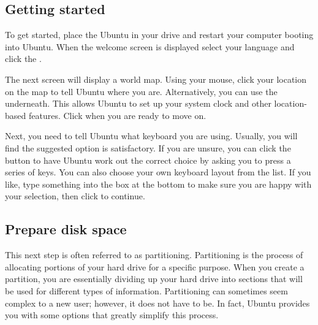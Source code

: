 \subsection{Getting started}
To get started, place the Ubuntu  in your  drive and restart your computer booting into Ubuntu. When the welcome screen is displayed select your language and click the .

The next screen will display a world map. Using your mouse, click your location on the map to tell Ubuntu where you are. Alternatively, you can use the  underneath. This allows Ubuntu to set up your system clock and other location-based features. Click  when you are ready to move on.


Next, you need to tell Ubuntu what keyboard you are using. Usually, you will find the suggested option is satisfactory. If you are unsure, you can click the  button to have Ubuntu work out the correct choice by asking you to press a series of keys. You can also choose your own keyboard layout from the list. If you like, type something into the box at the bottom to make sure you are happy with your selection, then click  to continue.


\subsection{Prepare disk space}

This next step is often referred to as \gls{partitioning}. Partitioning is the process of allocating portions of your hard drive for a specific purpose. When you create a \gls{partition}, you are essentially dividing up your hard drive into sections that will be used for different types of information. Partitioning can sometimes seem complex to a new user; however, it does not have to be. In fact, Ubuntu provides you with some options that greatly simplify this process.


